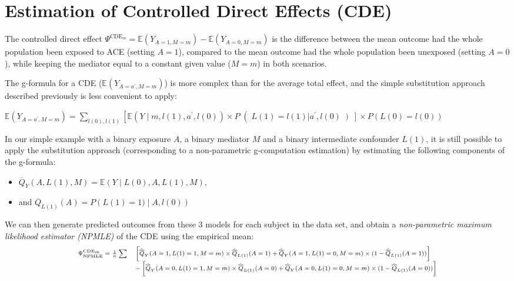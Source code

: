 \documentclass[
]{book}
\providecommand{\tightlist}{%
  \setlength{\itemsep}{0pt}\setlength{\parskip}{0pt}}
\begin{document}
\hypertarget{estimation-of-controlled-direct-effects-cde}{%
\section{Estimation of Controlled Direct Effects (CDE)}\label{estimation-of-controlled-direct-effects-cde}}

The controlled direct effect \(\Psi^{\text{CDE}_m} = \mathbb{E}(Y_{A=1,M=m}) - \mathbb{E}(Y_{A=0,M=m})\) is the difference between the mean outcome had the whole population been exposed to ACE (setting \(A=1\)), compared to the mean outcome had the whole population been unexposed (setting \(A=0\)), while keeping the mediator equal to a constant given value (\(M=m\)) in both scenarios.

The g-formula for a CDE (\(\mathbb{E}(Y_{A=a^\prime,M=m})\)) is more complex than for the average total effect, and the simple substitution approach described previously is less convenient to apply:

\(\mathbb{E}(Y_{A=a^\prime,M=m}) = \sum_{l(0),l(1)} \left[ \mathbb{E}\left(Y \mid m, l(1), a^\prime, l(0) \right) \times P\right( L(1)=l(1) | a^\prime,l(0) \left) \right] \times P\left( L(0)=l(0) \right)\)

In our simple example with a binary exposure \(A\), a binary mediator \(M\) and a binary intermediate confounder \(L(1)\), it is still possible to apply the substitution approach (corresponding to a non-parametric g-computation estimation) by estimating the following components of the g-formula:

\begin{itemize}
\tightlist
\item
  \(\overline{Q}_Y(A,L(1),M)=\mathbb{E}\left(Y \mid L(0), A,L(1), M \right)\),
\item
  and \(\overline{Q}_{L(1)}(A)=P\left(L(1)=1) \mid A, l(0)\right)\)
\end{itemize}

We can then generate predicted outcomes from these 3 models for each subject in the data set, and obtain a \emph{non-parametric maximum likelihood estimator (NPMLE)} of the CDE using the empirical mean:
\[\scriptsize
\begin{array}{r l}
\Psi^{\text{CDE}_m}_{\text{NPMLE}} = \frac{1}{n}\sum & \left[\hat{\overline{Q}}_Y(A=1,L(1)=1,M=m) \times \hat{\overline{Q}}_{L(1)}(A=1) + \hat{\overline{Q}}_Y(A=1,L(1)=0,M=m) \times (1 - \hat{\overline{Q}}_{L(1)}(A=1))\right]\\
  &  - \left[\hat{\overline{Q}}_Y(A=0,L(1)=1,M=m) \times \hat{\overline{Q}}_{L(1)}(A=0) + \hat{\overline{Q}}_Y(A=0,L(1)=0,M=m) \times (1 - \hat{\overline{Q}}_{L(1)}(A=0))\right]
\end{array}\]
\end{document}
